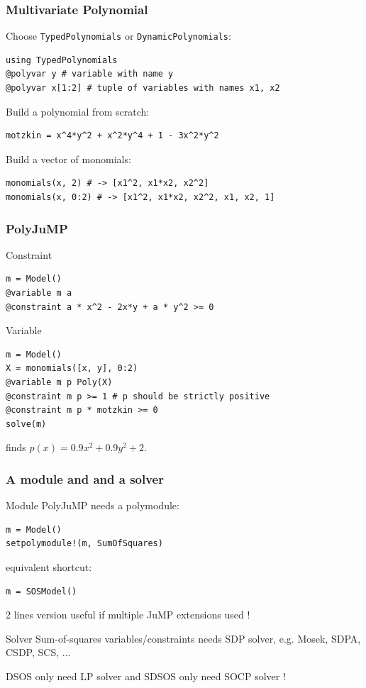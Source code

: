\documentclass{beamer}
\begin{document}
  \begin{frame}[fragile]
    \frametitle{Multivariate Polynomial}
    Choose \verb|TypedPolynomials| or \verb|DynamicPolynomials|:
\begin{verbatim}
using TypedPolynomials
@polyvar y # variable with name y
@polyvar x[1:2] # tuple of variables with names x1, x2
\end{verbatim}
    Build a polynomial from scratch:
\begin{verbatim}
motzkin = x^4*y^2 + x^2*y^4 + 1 - 3x^2*y^2
\end{verbatim}
    Build a vector of monomials:
\begin{verbatim}
monomials(x, 2) # -> [x1^2, x1*x2, x2^2]
monomials(x, 0:2) # -> [x1^2, x1*x2, x2^2, x1, x2, 1]
\end{verbatim}
  \end{frame}
  \begin{frame}[fragile]
    \frametitle{PolyJuMP}
    \begin{block}{Constraint}
\begin{verbatim}
m = Model()
@variable m a
@constraint a * x^2 - 2x*y + a * y^2 >= 0
\end{verbatim}
    \end{block}
    \begin{block}{Variable}
\begin{verbatim}
m = Model()
X = monomials([x, y], 0:2)
@variable m p Poly(X)
@constraint m p >= 1 # p should be strictly positive
@constraint m p * motzkin >= 0
solve(m)
\end{verbatim}
    finds $p(x) = 0.9x^2 + 0.9y^2 + 2$.
    \end{block}
  \end{frame}
  \begin{frame}[fragile]
    \frametitle{A module and and a solver}
    \begin{block}{Module}
    PolyJuMP needs a polymodule:
\begin{verbatim}
m = Model()
setpolymodule!(m, SumOfSquares)
\end{verbatim}
    \alert{equivalent} shortcut:
\begin{verbatim}
m = SOSModel()
\end{verbatim}
    2 lines version useful if multiple JuMP extensions used !
    \end{block}
    \begin{block}{Solver}
      Sum-of-squares variables/constraints needs SDP solver, e.g. Mosek, SDPA, CSDP, SCS, ...

      DSOS only need LP solver and SDSOS only need SOCP solver !
    \end{block}
  \end{frame}
\end{document}
